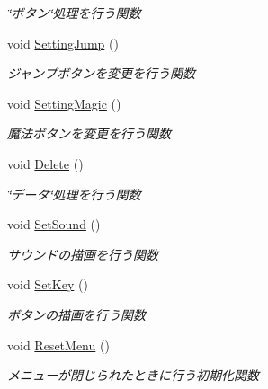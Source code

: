 \begin{DoxyCompactItemize}
\begin{DoxyCompactList}\small\item\em \char`\"{}ボタン\char`\"{}処理を行う関数 \end{DoxyCompactList}\item 
void \hyperlink{class_config_a949c8f8016a13dc0de2ad8478d950840}{Setting\+Jump} ()
\begin{DoxyCompactList}\small\item\em ジャンプボタンを変更を行う関数 \end{DoxyCompactList}\item 
void \hyperlink{class_config_a017861e162f694d0b63034ca0bdd99a5}{Setting\+Magic} ()
\begin{DoxyCompactList}\small\item\em 魔法ボタンを変更を行う関数 \end{DoxyCompactList}\item 
void \hyperlink{class_config_ad0b23b838070e0fc7d6232ccc3086f44}{Delete} ()
\begin{DoxyCompactList}\small\item\em \char`\"{}データ\char`\"{}処理を行う関数 \end{DoxyCompactList}\item 
void \hyperlink{class_config_a507cbfc344a6caf0d89dea1f0544861a}{Set\+Sound} ()
\begin{DoxyCompactList}\small\item\em サウンドの描画を行う関数 \end{DoxyCompactList}\item 
void \hyperlink{class_config_acc37b6bfa98a26666611bae4fe005d2e}{Set\+Key} ()
\begin{DoxyCompactList}\small\item\em ボタンの描画を行う関数 \end{DoxyCompactList}\item 
void \hyperlink{class_config_a3470f1dc49c85032a1e247d817413508}{Reset\+Menu} ()
\begin{DoxyCompactList}\small\item\em メニューが閉じられたときに行う初期化関数 \end{DoxyCompactList}\end{DoxyCompactItemize}
